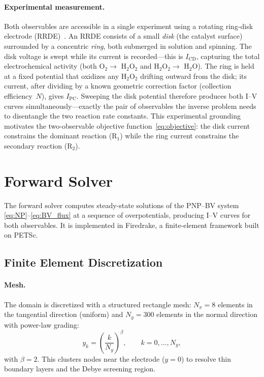 \documentclass[11pt,a4paper]{article}
\begin{document}
\paragraph{Experimental measurement.}
Both observables are accessible in a single experiment using a
rotating ring-disk electrode (RRDE)~\cite{ruggiero2022}.
An RRDE consists of a small \emph{disk} (the catalyst surface)
surrounded by a concentric \emph{ring}, both submerged in solution
and spinning.  The disk voltage is swept while its current is
recorded---this is $I_{\mathrm{CD}}$, capturing the total
electrochemical activity (both O$_2 \to$ H$_2$O$_2$ and
H$_2$O$_2 \to$ H$_2$O).  The ring is held at a fixed potential
that oxidizes any H$_2$O$_2$ drifting outward from the disk; its
current, after dividing by a known geometric correction factor
(collection efficiency~$N$), gives $I_{\mathrm{PC}}$.
Sweeping the disk potential therefore produces both I--V curves
simultaneously---exactly the pair of observables the inverse problem
needs to disentangle the two reaction rate constants.
This experimental grounding motivates the two-observable objective
function~\eqref{eq:objective}: the disk current constrains the dominant
reaction (R$_1$) while the ring current constrains the secondary
reaction (R$_2$).

\section{Forward Solver}\label{sec:forward}

The forward solver computes steady-state solutions of the PNP--BV system
\eqref{eq:NP}--\eqref{eq:BV_flux} at a sequence of overpotentials,
producing I--V curves for both observables. It is implemented in
Firedrake, a finite-element framework built on PETSc.

\subsection{Finite Element Discretization}\label{sec:mesh}

\paragraph{Mesh.}
The domain is discretized with a structured rectangle mesh:
$N_x = 8$ elements in the tangential direction (uniform) and
$N_y = 300$ elements in the normal direction with power-law grading:
\begin{equation}\label{eq:grading}
  y_k = \left(\frac{k}{N_y}\right)^{\!\beta}, \qquad k=0,\ldots,N_y,
\end{equation}
with $\beta = 2$. This clusters nodes near the electrode ($y=0$) to
resolve thin boundary layers and the Debye screening region.
\end{document}
